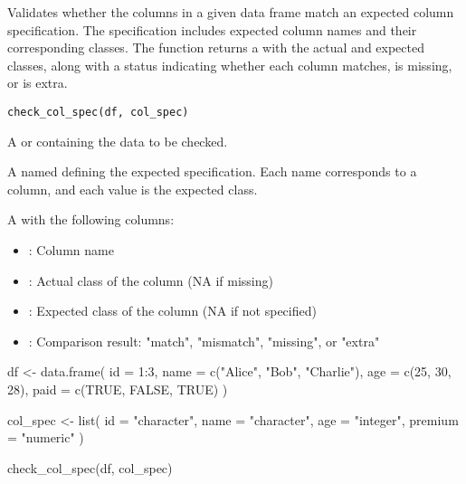 \documentclass[letterpaper]{book}
\begin{document}
%
\begin{Description}
Validates whether the columns in a given data frame match an expected
column specification. The specification includes expected column names
and their corresponding classes. The function returns a 
with the actual and expected classes, along with a status indicating
whether each column matches, is missing, or is extra.
\end{Description}
%
\begin{Usage}
\begin{verbatim}
check_col_spec(df, col_spec)
\end{verbatim}
\end{Usage}
%
\begin{Arguments}
\begin{ldescription}
\item[\code{df}] A  or  containing the data to be checked.

\item[\code{col\_spec}] A named  defining the expected specification.
Each name corresponds to a column, and each value is the expected class.
\end{ldescription}
\end{Arguments}
%
\begin{Value}
A  with the following columns:
\begin{itemize}

\item{} : Column name
\item{} : Actual class of the column (NA if missing)
\item{} : Expected class of the column (NA if not specified)
\item{} : Comparison result: "match", "mismatch", "missing", or "extra"

\end{itemize}

\end{Value}
%
\begin{Examples}
\begin{ExampleCode}

df <- data.frame(
  id = 1:3,
  name = c("Alice", "Bob", "Charlie"),
  age = c(25, 30, 28),
  paid = c(TRUE, FALSE, TRUE)
)

col_spec <- list(
  id = "character",
  name = "character",
  age = "integer",
  premium = "numeric"
)

check_col_spec(df, col_spec)

\end{ExampleCode}
\end{Examples}
\end{document}
